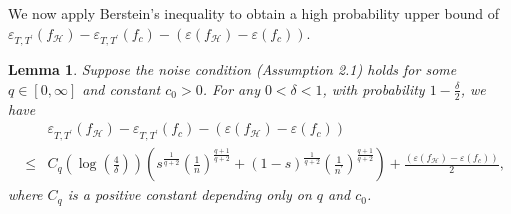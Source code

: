 \documentclass{article}
\newtheorem{lemma}{Lemma}
\begin{document}
We now apply Berstein's inequality to obtain a high probability upper bound of  $\varepsilon_{T,T^\prime}(f_\mathcal{H}) - \varepsilon_{T,T^\prime}(f_c) - (\varepsilon(f_\mathcal{H})- \varepsilon(f_c))$.
\begin{lemma}\label{lemma: estimationI}
   Suppose the noise condition (Assumption 2.1) holds for some $q\in [0, \infty]$ and constant $c_0>0$. For any $0 <\delta < 1$, with probability $1-\frac{\delta}{2}$, we have 
    \begin{eqnarray}\label{estimationI_eqn}
        && \varepsilon_{T,T^\prime}(f_\mathcal{H}) - \varepsilon_{T,T^\prime}(f_c) - (\varepsilon(f_\mathcal{H})- \varepsilon(f_c)) \nonumber\\
         &\leq&  C_{q} \left(\log\left(\frac{4}{\delta}\right)\right)\left(s^{\frac{1}{q+2}}\left(\frac{1}{n}\right)^{\frac{q+1}{q+2}}+(1-s)^{\frac{1}{q+2}}\left(\frac{1}{n^\prime}\right)^{\frac{q+1}{q+2}}\right) + \frac{(\varepsilon(f_\mathcal{H}) - \varepsilon(f_c))}{2},
    \end{eqnarray}
    where $C_{q}$ is a positive constant depending only on $q$ and $c_0$.
\end{lemma}
\end{document}
